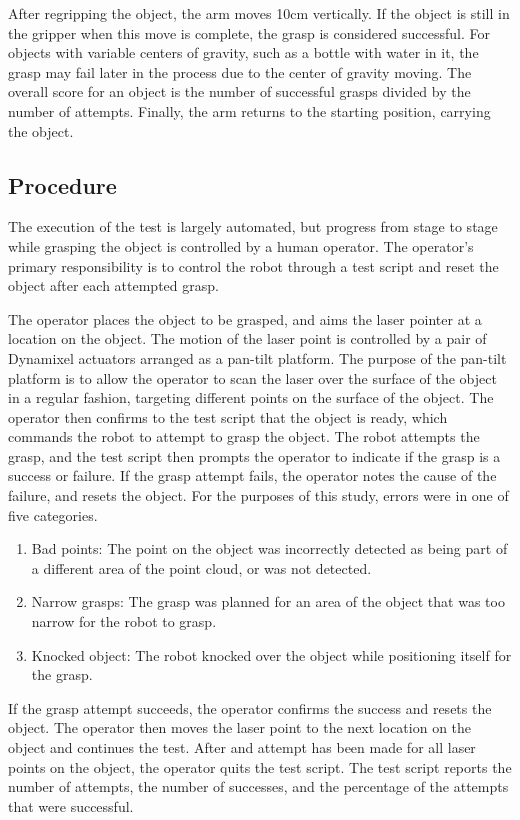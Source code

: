 \documentclass[letterpaper, 10 pt, conference]{ieeeconf}
\begin{document}
After regripping the object, the arm moves 10cm vertically. If the object is still in the gripper when this move is complete, the grasp is considered successful. 
For objects with variable centers of gravity, such as a bottle with water in it, the grasp may fail later in the process due to the center of gravity moving. 
The overall score for an object is the number of successful grasps divided by the number of attempts.
Finally, the arm returns to the starting position, carrying the object. 

\subsection{Procedure}

The execution of the test is largely automated, but progress from stage to stage while grasping the object is controlled by a human operator. 
The operator's primary responsibility is to control the robot through a test script and reset the object after each attempted grasp.

The operator places the object to be grasped, and aims the laser pointer at a location on the object. 
The motion of the laser point is controlled by a pair of Dynamixel actuators arranged as a pan-tilt platform.
The purpose of the pan-tilt platform is to allow the operator to scan the laser over the surface of the object in a regular fashion, targeting different points on the surface of the object. 
The operator then confirms to the test script that the object is ready, which commands the robot to attempt to grasp the object. 
The robot attempts the grasp, and the test script then prompts the operator to indicate if the grasp is a success or failure. 
If the grasp attempt fails, the operator notes the cause of the failure, and resets the object. 
For the purposes of this study, errors were in one of five categories.
\begin{enumerate}
  \item Bad points: The point on the object was incorrectly detected as being part of a different area of the point cloud, or was not detected. 
  \item Narrow grasps: The grasp was planned for an area of the object that was too narrow for the robot to grasp.
  \item Knocked object: The robot knocked over the object while positioning itself for the grasp.
\end{enumerate}

If the grasp attempt succeeds, the operator confirms the success and resets the object. 
The operator then moves the laser point to the next location on the object and continues the test. 
After and attempt has been made for all laser points on the object, the operator quits the test script. 
The test script reports the number of attempts, the number of successes, and the percentage of the attempts that were successful. 
\end{document}
